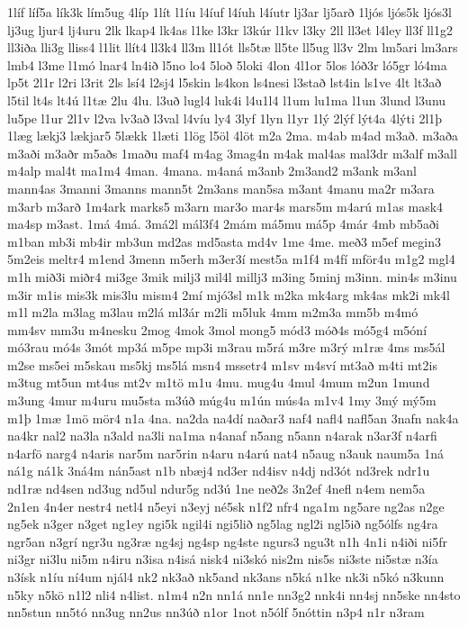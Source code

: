 {1líf
líf5a
lík3k
lím5ug
4líp
1lít
l1íu
l4íuf
l4íuh
l4íutr
lj3ar
lj5arð
1ljós
ljós5k
ljós3l
lj3ug
ljur4
lj4uru
2lk
lkap4
lk4as
l1ke
l3kr
l3kúr
l1kv
l3ky
2ll
ll3et
l4ley
ll3f
ll1g2
ll3iða
lli3g
lliss4
l1lit
llít4
ll3k4
ll3m
ll1ót
lls5tæ
ll5te
ll5ug
ll3v
2lm
lm5ari
lm3ars
lmb4
l3me
l1mó
lnar4
ln4ið
l5no
lo4
5loð
5loki
4lon
4l1or
5los
lóð3r
ló5gr
ló4ma
lp5t
2l1r
l2ri
l3rit
2ls
lsí4
l2sj4
l5skin
ls4kon
ls4nesi
l3stað
lst4in
ls1ve
4lt
lt3að
l5til
lt4s
lt4ú
l1tæ
2lu
4lu.
l3uð
lugl4
luk4i
l4u1l4
l1um
lu1ma
l1un
3lund
l3unu
lu5pe
l1ur
2l1v
l2va
lv3að
l3val
l4víu
ly4
3lyf
1lyn
l1yr
1lý
2lýf
lýt4a
4lýti
2l1þ
1læg
lækj3
lækjar5
5lækk
1læti
1lög
l5öl
4löt
m2a
2ma.
m4ab
m4ad
m3að.
m3aða
m3aði
m3aðr
m5aðs
1maðu
maf4
m4ag
3mag4n
m4ak
mal4as
mal3dr
m3alf
m3all
m4alp
mal4t
ma1m4
4man.
4mana.
m4aná
m3anb
2m3and2
m3ank
m3anl
mann4as
3manni
3manns
mann5t
2m3ans
man5sa
m3ant
4manu
ma2r
m3ara
m3arb
m3arð
1m4ark
marks5
m3arn
mar3o
mar4s
mars5m
m4arú
m1as
mask4
ma4sp
m3ast.
1má
4má.
3má2l
mál3f4
2mám
má5mu
má5p
4már
4mb
mb5aði
m1ban
mb3i
mb4ir
mb3un
md2as
md5asta
md4v
1me
4me.
með3
m5ef
megin3
5m2eis
meltr4
m1end
3menn
m5erh
m3er3í
mest5a
m1f4
m4fí
mför4u
m1g2
mgl4
m1h
mið3i
miðr4
mi3ge
3mik
milj3
mil4l
millj3
m3ing
5minj
m3inn.
min4s
m3inu
m3ir
m1is
mis3k
mis3lu
mism4
2mí
mjó3sl
m1k
m2ka
mk4arg
mk4as
mk2i
mk4l
m1l
m2la
m3lag
m3lau
m2lá
ml3ár
m2li
m5luk
4mm
m2m3a
mm5b
m4mó
mm4sv
mm3u
m4nesku
2mog
4mok
3mol
mong5
mód3
móð4s
mó5g4
m5óní
mó3rau
mó4s
3mót
mp3á
m5pe
mp3i
m3rau
m5rá
m3re
m3rý
m1ræ
4ms
ms5ál
m2se
ms5ei
m5skau
ms5kj
ms5lá
msn4
mssetr4
m1sv
m4sví
mt3að
m4ti
mt2is
m3tug
mt5un
mt4us
mt2v
m1tö
m1u
4mu.
mug4u
4mul
4mum
m2un
1mund
m3ung
4mur
m4uru
mu5sta
m3úð
múg4u
m1ún
mús4a
m1v4
1my
3mý
mý5m
m1þ
1mæ
1mö
mör4
n1a
4na.
na2da
na4dí
naðar3
naf4
nafl4
nafl5an
3nafn
nak4a
na4kr
nal2
na3la
n3ald
na3li
na1ma
n4anaf
n5ang
n5ann
n4arak
n3ar3f
n4arfi
n4arfö
narg4
n4aris
nar5m
nar5rin
n4aru
n4arú
nat4
n5aug
n3auk
naum5a
1ná
ná1g
ná1k
3ná4m
nán5ast
n1b
nbæj4
nd3er
nd4isv
n4dj
nd3ót
nd3rek
ndr1u
nd1ræ
nd4sen
nd3ug
nd5ul
ndur5g
nd3ú
1ne
neð2s
3n2ef
4nefl
n4em
nem5a
2n1en
4n4er
nestr4
netl4
n5eyi
n3eyj
né5sk
n1f2
nfr4
nga1m
ng5are
ng2as
n2ge
ng5ek
n3ger
n3get
ng1ey
ngi5k
ngil4i
ngi5lið
ng5lag
ngl2i
ngl5ið
ng5ólfs
ng4ra
ngr5an
n3grí
ngr3u
ng3ræ
ng4sj
ng4sp
ng4ste
ngurs3
ngu3t
n1h
4n1i
n4iði
ni5fr
ni3gr
ni3lu
ni5m
n4iru
n3isa
n4isá
nisk4
ni3skó
nis2m
nis5s
ni3ste
ni5stæ
n3ía
n3ísk
n1íu
ní4um
njál4
nk2
nk3að
nk5and
nk3ans
n5ká
n1ke
nk3i
n5kó
n3kunn
n5ky
n5kö
n1l2
nli4
n4list.
n1m4
n2n
nn1á
nn1e
nn3g2
nnk4i
nn4sj
nn5ske
nn4sto
nn5stun
nn5tó
nn3ug
nn2us
nn3úð
n1or
1not
n5ólf
5nóttin
n3p4
n1r
n3ram
}
